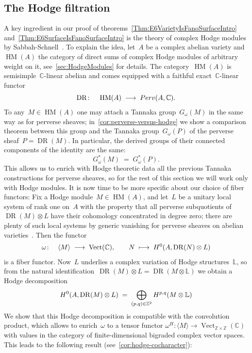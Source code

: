 \documentclass[a4paper]{amsart}
\newcommand{\bbC}{\mathbb{C}}
\newcommand{\bbL}{\mathbb{L}}
\newcommand{\bbZ}{\mathbb{Z}}
\newcommand{\rH}{\textup{H}}
\newcommand{\Perv}{\textup{Perv}}
\DeclareMathOperator{\Vect}{Vect}
\DeclareMathOperator{\DR}{DR}
\DeclareMathOperator{\HM}{HM}
\theoremstyle{plain}
\theoremstyle{definition}
\numberwithin{equation}{section}
\begin{document}
\subsection{The Hodge filtration}

A key ingredient in our proof of theorems~\ref{Thm:E6VarietyIsFanoSurfaceIntro} and~\ref{Thm:E6SurfaceIsFanoSurfaceIntro} is the theory of complex Hodge modules by Sabbah-Schnell~\cite{MHMProject}. To explain the idea, let~$A$ be a complex abelian variety and~$\HM(A)$ the category of direct sums of complex Hodge modules of arbitrary weight on it, see~\cref{sec:HodgeModules} for details. The category~$\HM(A)$ is semisimple~$\bbC$-linear abelian and comes equipped with a faithful exact~$\bbC$-linear functor
%
\[
 \DR\colon \quad \HM(A) \;\longrightarrow\; \Perv(A, \bbC).
\]
%
To any~$M\in \HM(A)$ one may attach a Tannaka group~$G_\omega(M)$ in the same way as for perverse sheaves; in~\cref{cor:perverse-versus-hodge} we show a comparison theorem between this group and the Tannaka group~$G_\omega(P)$ of the perverse sheaf~$P=\DR(M)$. In particular, the derived groups of their connected components of the identity are the same:
%
\[
G_\omega^\ast(M) \;=\; G_\omega^\ast(P).
\]
%
This allows us to enrich with Hodge theoretic data all the previous Tannaka constructions for perverse sheaves, so for the rest of this section we will work only with Hodge modules. It is now time to be more specific about our choice of fiber functors: Fix a Hodge module~$M\in \HM(A)$, and let~$L$ be a unitary local system of rank one on~$A$ with the property that all perverse subquotients of~$\DR(M)\otimes L$ have their cohomology concentrated in degree zero; there are plenty of such local systems by  generic vanishing for perverse sheaves on abelian varieties~\cite{KWVanishing, SchnellHolonomic}. Then the functor
%
\[
 \omega \colon \quad \langle M \rangle \;\longrightarrow\; \Vect(\bbC), \qquad N \;\longmapsto\; \rH^0(A, \DR(N)\otimes L)
\]
%
is a fiber functor. Now~$L$ underlies a complex variation of Hodge structures~$\bbL$, so from the natural identification~$\DR(M)\otimes L = \DR(M\otimes \bbL)$ we obtain a Hodge decomposition 
%
\[
 \rH^0(A, \DR(M)\otimes L) \;=\; \bigoplus_{(p,q)\in \bbZ^2} \rH^{p,q}(M\otimes \bbL)
\]
%
We show that this Hodge decomposition is compatible with the convolution product, which allows to enrich~$\omega$ to a tensor functor 
%
$\omega^H\colon 
\langle M \rangle \rightarrow \Vect_{\bbZ\times \bbZ}(\bbC)$
%
with values in the category of finite-dimensional bigraded complex vector spaces. This leads to the following result (see~\cref{cor:hodge-cocharacter}):
\end{document}
